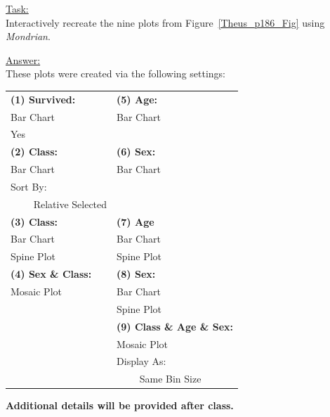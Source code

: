 \documentclass[12pt,letterpaper,final]{article}
\begin{document}
\underline{Task:} \\
Interactively recreate the nine plots from Figure~\ref{Theus_p186_Fig}
using {\it Mondrian}.




\newpage


\if{}

\underline{Answer:} \\



These plots were created via the following settings:
\begin{table}[h]
\small
\centering
\begin{tabular}{|l|l|}
\hline
{\bf (1) Survived:} & {\bf (5) Age:} \\
Bar Chart & Bar Chart \\
Yes & \\
\hline
{\bf (2) Class:} & {\bf (6) Sex:} \\
Bar Chart & Bar Chart \\
Sort By: & \\
~~~~ Relative Selected & \\
\hline
{\bf (3) Class:} & {\bf (7) Age} \\
Bar Chart & Bar Chart \\
Spine Plot & Spine Plot \\
\hline
{\bf (4) Sex \& Class:} & {\bf (8) Sex:} \\
Mosaic Plot & Bar Chart \\
 & Spine Plot \\
\hline
 & {\bf (9) Class \& Age \& Sex:} \\
 & Mosaic Plot \\
 & Display As: \\
 & ~~~~ Same Bin Size \\
\hline
\end{tabular}
\end{table}


\else
{\bf Additional details will be provided after class.}
\fi
\end{document}
